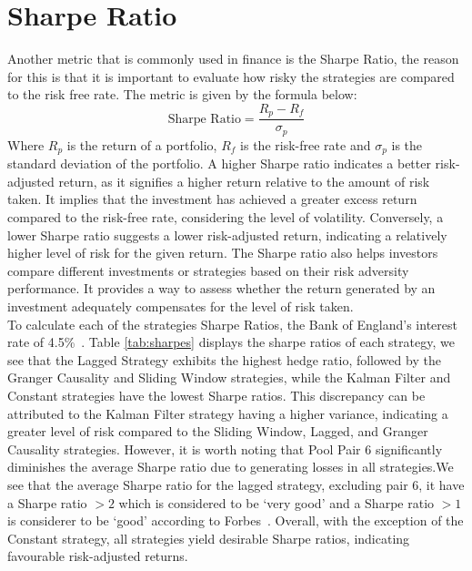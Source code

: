 \section{Sharpe Ratio}
Another metric that is commonly used in finance is the Sharpe Ratio, the reason for this is that it is important to evaluate how risky the strategies are compared to the risk free rate. The metric is given by the formula below:$$\text{Sharpe Ratio} = \frac{R_p - R_f}{\sigma_p}$$ Where $R_p$ is the return of a portfolio, $R_f$ is the risk-free rate and $\sigma_p$ is the standard deviation of the portfolio. A higher Sharpe ratio indicates a better risk-adjusted return, as it signifies a higher return relative to the amount of risk taken. It implies that the investment has achieved a greater excess return compared to the risk-free rate, considering the level of volatility. Conversely, a lower Sharpe ratio suggests a lower risk-adjusted return, indicating a relatively higher level of risk for the given return. The Sharpe ratio also helps investors compare different investments or strategies based on their risk adversity performance. It provides a way to assess whether the return generated by an investment adequately compensates for the level of risk taken. 
\\[5mm]
To calculate each of the strategies Sharpe Ratios, the Bank of England's interest rate of 4.5\%~\cite{boe_interest}. Table \ref{tab:sharpes} displays the sharpe ratios of each strategy, we see that the Lagged Strategy exhibits the highest hedge ratio, followed by the Granger Causality and Sliding Window strategies, while the Kalman Filter and Constant strategies have the lowest Sharpe ratios. This discrepancy can be attributed to the Kalman Filter strategy having a higher variance, indicating a greater level of risk compared to the Sliding Window, Lagged, and Granger Causality strategies. However, it is worth noting that Pool Pair 6 significantly diminishes the average Sharpe ratio due to generating losses in all strategies.We see that the average Sharpe ratio for the lagged strategy, excluding pair 6, it have a Sharpe ratio $>2$ which is considered to be `very good' and a Sharpe ratio $>1$ is considerer to be `good' according to Forbes~\cite{forbes_sharpe_ratio}. Overall, with the exception of the Constant strategy, all strategies yield desirable Sharpe ratios, indicating favourable risk-adjusted returns.

